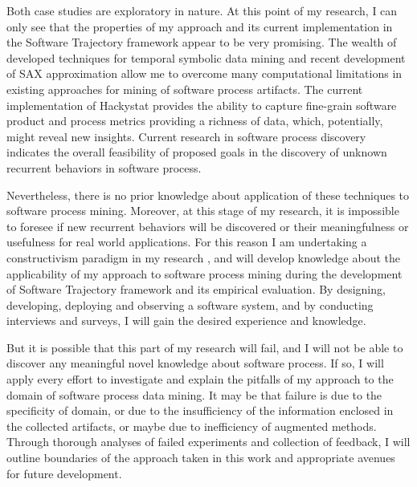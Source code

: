Both case studies are exploratory in nature. At this point of my research, I can only see that the properties of my approach and its current implementation in the Software Trajectory framework appear to be very promising. The wealth of developed techniques for temporal symbolic data mining and recent development of SAX approximation allow me to overcome many computational limitations in existing approaches for mining of software process artifacts. The current implementation of Hackystat provides the ability to capture fine-grain software product and process metrics providing a richness of data, which, potentially, might reveal new insights. Current research in software process discovery indicates the overall feasibility of proposed goals in the discovery of unknown recurrent behaviors in software process. 

Nevertheless, there is no prior knowledge about application of these techniques to software process mining. Moreover, at this stage of my research, it is impossible to foresee if new recurrent behaviors will be discovered or their meaningfulness or usefulness for real world applications. For this reason I am undertaking a constructivism paradigm in my research \cite{citeulike:209817}, and will develop knowledge about the applicability of my approach to software process mining during the development of Software Trajectory framework and its empirical evaluation. By designing, developing, deploying and observing a software system, and by conducting interviews and surveys, I will gain the desired experience and knowledge.

But it is possible that this part of my research will fail, and I will not be able to discover any meaningful novel knowledge about software process. If so, I will apply every effort to investigate and explain the pitfalls of my approach to the domain of software process data mining. It may be that failure is due to the specificity of domain, or due to the insufficiency of the information enclosed in the collected artifacts, or maybe due to inefficiency of augmented methods. Through thorough analyses of failed experiments and collection of feedback, I will outline boundaries of the approach taken in this work and appropriate avenues for future development.
